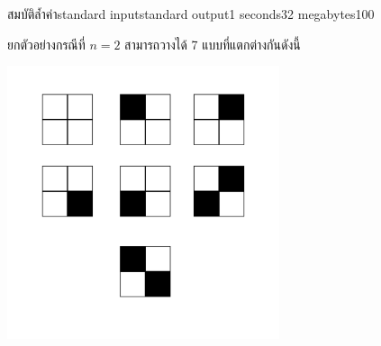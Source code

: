 \documentclass[11pt,a4paper]{article}
\begin{document}
\begin{problem}{สมบัติล้ำค่า}{standard input}{standard output}{1 seconds}{32 megabytes}{100}
\Note
\begin{note}
ยกตัวอย่างกรณีที่ $n = 2$ สามารถวางได้ 7 แบบที่แตกต่างกันดังนี้

\begin{center}
\includegraphics[width=8cm]{Sample.jpg}
\end{center}

\end{note}

\end{problem}
\end{document}
